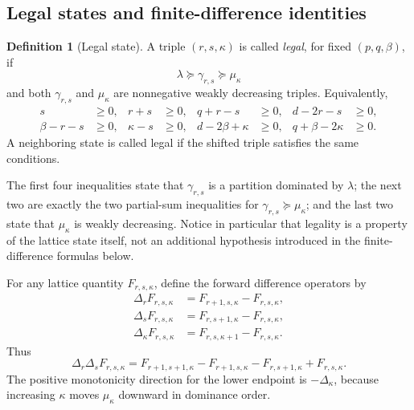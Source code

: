 \documentclass[11pt]{article}
\theoremstyle{definition}
\newtheorem{definition}[theorem]{Definition}
\begin{document}
\subsection{Legal states and finite-difference identities}

\begin{definition}[Legal state]
\label{def:legal-state}
A triple \((r,s,\kappa)\) is called \emph{legal}, for fixed \((p,q,\beta)\), if
\begin{equation*}
\lambda\succcurlyeq\gamma_{r,s}\succcurlyeq\mu_\kappa
\end{equation*}
and both \(\gamma_{r,s}\) and \(\mu_\kappa\) are nonnegative weakly decreasing triples.
Equivalently,
\begin{align*}
s&\ge0,
& r+s&\ge0,
& q+r-s&\ge0,
& d-2r-s&\ge0,\\
\beta-r-s&\ge0,
& \kappa-s&\ge0,
& d-2\beta+\kappa&\ge0,
& q+\beta-2\kappa&\ge0.
\end{align*}
A neighboring state is called legal if the shifted triple satisfies the same conditions.
\end{definition}

The first four inequalities state that \(\gamma_{r,s}\) is a partition dominated by \(\lambda\); the next two are exactly the two partial-sum inequalities for
\(\gamma_{r,s}\succcurlyeq\mu_\kappa\); and the last two state that \(\mu_\kappa\) is weakly decreasing.  Notice in particular that legality is a property of the lattice state itself, not an additional hypothesis introduced in the finite-difference formulas below.

For any lattice quantity \(F_{r,s,\kappa}\), define the forward difference operators by
\begin{align*}
\Delta_rF_{r,s,\kappa}
&=
F_{r+1,s,\kappa}-F_{r,s,\kappa},\\
\Delta_sF_{r,s,\kappa}
&=
F_{r,s+1,\kappa}-F_{r,s,\kappa},\\
\Delta_\kappa F_{r,s,\kappa}
&=
F_{r,s,\kappa+1}-F_{r,s,\kappa}.
\end{align*}
Thus
\begin{equation*}
\Delta_r\Delta_sF_{r,s,\kappa}
=
F_{r+1,s+1,\kappa}
-F_{r+1,s,\kappa}
-F_{r,s+1,\kappa}
+F_{r,s,\kappa}.
\end{equation*}
The positive monotonicity direction for the lower endpoint is \(-\Delta_\kappa\), because increasing \(\kappa\) moves \(\mu_\kappa\) downward in dominance order.
\end{document}
